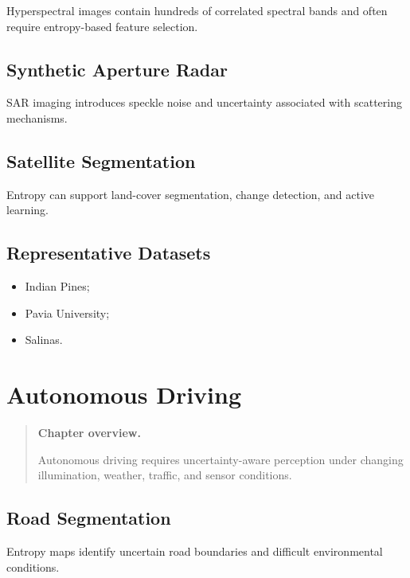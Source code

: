 \documentclass[11pt,oneside]{book}
\theoremstyle{remark}
\newenvironment{chapteroverview}
{
	\begin{quote}
		\small
		\textbf{Chapter overview.}
	}
	{
	\end{quote}
}
\newenvironment{datasetlist}
{
	\begin{itemize}[label=\(\triangleright\)]
	}
	{
	\end{itemize}
}
\begin{document}
	Hyperspectral images contain hundreds of correlated spectral bands and often
	require entropy-based feature selection.
	
	\section{Synthetic Aperture Radar}
	
	SAR imaging introduces speckle noise and uncertainty associated with scattering
	mechanisms.
	
	\section{Satellite Segmentation}
	
	Entropy can support land-cover segmentation, change detection, and active
	learning.
	
	\section*{Representative Datasets}
	
	\begin{datasetlist}
		\item Indian Pines;
		\item Pavia University;
		\item Salinas.
	\end{datasetlist}
	
	
	\chapter{Autonomous Driving}
	\label{chap:autonomous-driving}
	
	\begin{chapteroverview}
		Autonomous driving requires uncertainty-aware perception under changing
		illumination, weather, traffic, and sensor conditions.
	\end{chapteroverview}
	
	\section{Road Segmentation}
	
	Entropy maps identify uncertain road boundaries and difficult environmental
	conditions.
	
\end{document}

